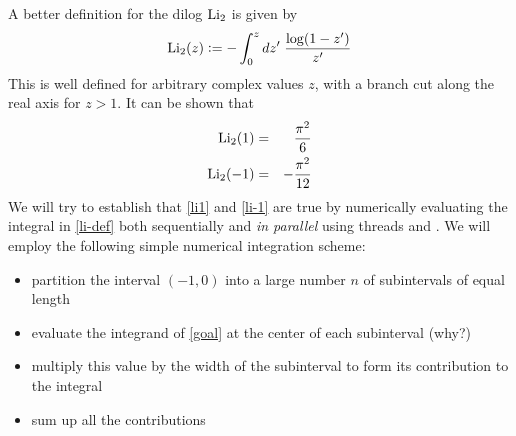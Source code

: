 %
%
%
%

\pagestyle{headandfoot}
\runningfootrule
{}
\runningheader{}{}{}
\firstpagefooter{}{}{}



\def\Li{\mbox{\rm Li}_{2}}
\def\len{\mbox{\rm length}}
\def\dilog{\mbox{\tt dilog}}

A better definition for the dilog $\Li$ is given by
%
\begin{equation}
\Li(z) \bydef
- \int_{0}^{z} dz' \; \frac{\log(1-z')}{z'} \label{eq:li-def}
\end{equation}
%
This is well defined for arbitrary complex values $z$, with a branch cut along the real axis
for $z > 1$. It can be shown that
%
\begin{eqnarray}
  \Li(1)  & = & \frac{\pi^{2}}{6} \label{eq:li1} \\
  \Li(-1) & = & - \frac{\pi^{2}}{12} \label{eq:li-1}
\end{eqnarray}
%
We will try to establish that \eqref{li1} and \eqref{li-1} are true by numerically evaluating
the integral in \eqref{li-def} both sequentially and {\em in parallel} using threads and \mpi.
%
We will employ the following simple numerical integration scheme:
%
\begin{itemize}
 \item partition the interval $(-1,0)$ into a large number $n$ of subintervals of equal length
 \item evaluate the integrand of \eqref{goal} at the center of each subinterval (why?)
 \item multiply this value by the width of the subinterval to form its contribution to the
   integral
 \item sum up all the contributions
\end{itemize}

